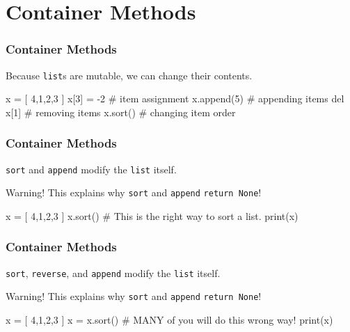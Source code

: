 \documentclass[11pt]{beamer}
\begin{document}
\section{Container Methods}

\begin{frame}[fragile]
  \frametitle{Container Methods}
  \Enlarge

  \begin{itemize}
  \myitem  Because \texttt{list}s are mutable, we can change their contents. %
  \end{itemize}
  \begin{semiverbatim}
x = [ 4,1,2,3 ]
x[3] = -2       # item assignment
x.append(5)     # appending items
del x[1]        # removing items
x.sort()        # changing item order
  \end{semiverbatim}
\end{frame}

\begin{frame}[fragile]
  \frametitle{Container Methods}
  \Enlarge

  \begin{itemize}
  \myitem  \texttt{sort} and \texttt{append} modify the \texttt{list} itself. %
  \end{itemize}
  \begin{alertblock}{Warning!}
  This explains why \texttt{sort} and \texttt{append} \texttt{return None}!
  \end{alertblock}
  \begin{semiverbatim}
x = [ 4,1,2,3 ]
x.sort()   # This is the right way to sort a list.
print(x)
  \end{semiverbatim}
\end{frame}

\begin{frame}[fragile]
  \frametitle{Container Methods}
  \Enlarge

  \begin{itemize}
  \myitem  \texttt{sort}, \texttt{reverse}, and \texttt{append} modify the \texttt{list} itself.
  \end{itemize}
  \begin{alertblock}{Warning!}
  This explains why \texttt{sort} and \texttt{append} \texttt{return None}!
  \end{alertblock}
  \begin{semiverbatim}
x = [ 4,1,2,3 ]
x = x.sort() # MANY of you will do this wrong way!
print(x)
  \end{semiverbatim}
\end{frame}
\end{document}
